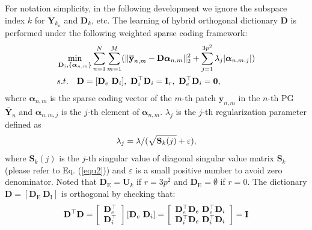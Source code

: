 \documentclass[10pt,twocolumn,letterpaper]{article}
\begin{document}
For notation simplicity, in the following development we ignore the subspace index $k$ for $\mathbf{\overline{Y}}_{k_{n}}$ and $\mathbf{D}_{k}$, etc. The learning of hybrid orthogonal dictionary $\mathbf{D}$ is performed under the following weighted sparse coding
framework:
\vspace{-2mm}
\begin{equation}\label{equ4}\vspace{-3mm}
\begin{split}
&\min_{\mathbf{D}_{i},\{\bm{\alpha}_{n,m}\}}
\sum_{n=1}^{N}\sum_{m=1}^{M}(\|\mathbf{\overline{y}}_{n,m}-\mathbf{D}\bm{\alpha}_{n,m}\|_{2}^{2}+\sum_{j=1}^{3p^{2}}\lambda_{j}|\bm{\alpha}_{n,m,j}|)
\\
&
s.t.
\quad
\mathbf{D}=[\mathbf{D}_{e}\ \mathbf{D}_{i}],\ \mathbf{D}_{i}^{\top}\mathbf{D}_{i} = \mathbf{I}_{r},\ \mathbf{D}_{e}^{\top}\mathbf{D}_{i} = \mathbf{0},
\end{split}
\end{equation}
where $\bm{\alpha}_{n,m}$ is the sparse coding vector of the $m$-th patch $\mathbf{\overline{y}}_{n,m}$ in the $n$-th PG $\mathbf{\overline{Y}}_{n}$ and $\bm{\alpha}_{n,m,j}$ is the $j$-th element of $\bm{\alpha}_{n,m}$. $\lambda_{j}$ is the $j$-th regularization parameter defined as
\vspace{-1mm}
\begin{equation}\label{equ5}\vspace{-1mm}
\lambda_{j} = \lambda/(\sqrt{\mathbf{S}_{k}(j)}+\varepsilon),
\end{equation}
where $\mathbf{S}_{k}(j)$ is the $j$-th singular value of diagonal singular value matrix $\mathbf{S}_{k}$ (please refer to Eq. (\ref{equ2})) and $\varepsilon$ is a small positive number to avoid zero denominator. Noted that $\mathbf{D}_{\text{E}}=\mathbf{U}_{k}$ if $r=3p^{2}$ and $\mathbf{D}_{\text{E}}=\emptyset$ if $r=0$. The dictionary $\mathbf{D} = [\mathbf{D}_{\text{E}}\ \mathbf{D}_{\text{I}}]$ is orthogonal by checking that:
\vspace{-2mm}
\begin{equation}\label{equ6}\vspace{-1mm}
\mathbf{D}^{\top}\mathbf{D} = 
\left[\begin{array}{c}
\mathbf{D}_{e}^{\top}
\\
\mathbf{D}_{i}^{\top}
\end{array}\right]
[\mathbf{D}_{e}\ \mathbf{D}_{i}]
=
\left[\begin{array}{cc}
\mathbf{D}_{e}^{\top}\mathbf{D}_{e}\ \mathbf{D}_{e}^{\top}\mathbf{D}_{i}
\\
\mathbf{D}_{i}^{\top}\mathbf{D}_{e}\ \mathbf{D}_{i}^{\top}\mathbf{D}_{i}
\end{array}\right]
=
\mathbf{I}
\end{equation}
\end{document}

